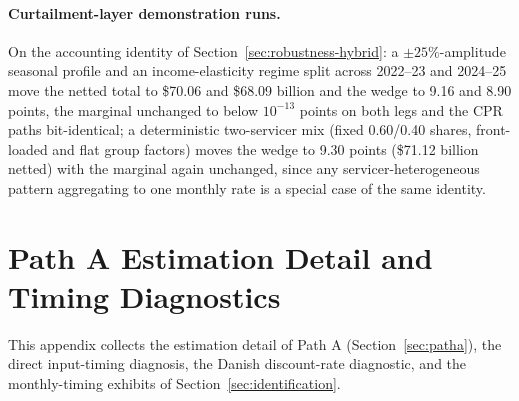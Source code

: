 \documentclass[12pt]{article}
\begin{document}
\paragraph{Curtailment-layer demonstration runs.} On the accounting identity of Section~\ref{sec:robustness-hybrid}: a $\pm 25\%$-amplitude seasonal profile and an income-elasticity regime split across 2022--23 and 2024--25 move the netted total to \$70.06 and \$68.09 billion and the wedge to 9.16 and 8.90 points, the marginal unchanged to below $10^{-13}$ points on both legs and the CPR paths bit-identical; a deterministic two-servicer mix (fixed 0.60/0.40 shares, front-loaded and flat group factors) moves the wedge to 9.30 points (\$71.12 billion netted) with the marginal again unchanged, since any servicer-heterogeneous pattern aggregating to one monthly rate is a special case of the same identity.

\section{Path A Estimation Detail and Timing Diagnostics}\label{app:patha-detail}

This appendix collects the estimation detail of Path A (Section~\ref{sec:patha}), the direct input-timing diagnosis, the Danish discount-rate diagnostic, and the monthly-timing exhibits of Section~\ref{sec:identification}.
\end{document}
